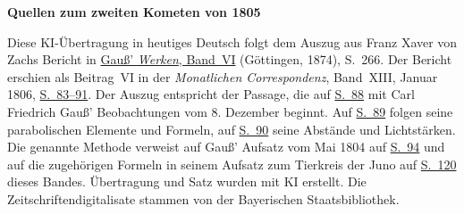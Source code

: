 \clearpage\thispagestyle{empty}
\begin{center}\textbf{Quellen zum zweiten Kometen von 1805}\end{center}
\noindent Diese KI-Übertragung in heutiges Deutsch folgt dem Auszug aus Franz Xaver von Zachs Bericht in \href{https://gdz.sub.uni-goettingen.de/id/PPN236007467}{Gauß’ \textit{Werken}, Band~VI} (Göttingen, 1874), S.~266. Der Bericht erschien als Beitrag~VI in der \textit{Monatlichen Correspondenz}, Band~XIII, Januar 1806, \href{https://www.digitale-sammlungen.de/en/view/bsb10538605?page=91}{S.~83--91}. Der Auszug entspricht der Passage, die auf \href{https://www.digitale-sammlungen.de/en/view/bsb10538605?page=96}{S.~88} mit Carl Friedrich Gauß’ Beobachtungen vom 8. Dezember beginnt. Auf \href{https://www.digitale-sammlungen.de/en/view/bsb10538605?page=97}{S.~89} folgen seine parabolischen Elemente und Formeln, auf \href{https://www.digitale-sammlungen.de/en/view/bsb10538605?page=98}{S.~90} seine Abstände und Lichtstärken. Die genannte Methode verweist auf Gauß’ Aufsatz vom Mai 1804 auf \hyperlink{native-99}{S.~94} und auf die zugehörigen Formeln in seinem Aufsatz zum Tierkreis der Juno auf \hyperlink{native-125}{S.~120} dieses Bandes. Übertragung und Satz wurden mit KI erstellt. Die Zeitschriftendigitalisate stammen von der Bayerischen Staatsbibliothek.
\clearpage
